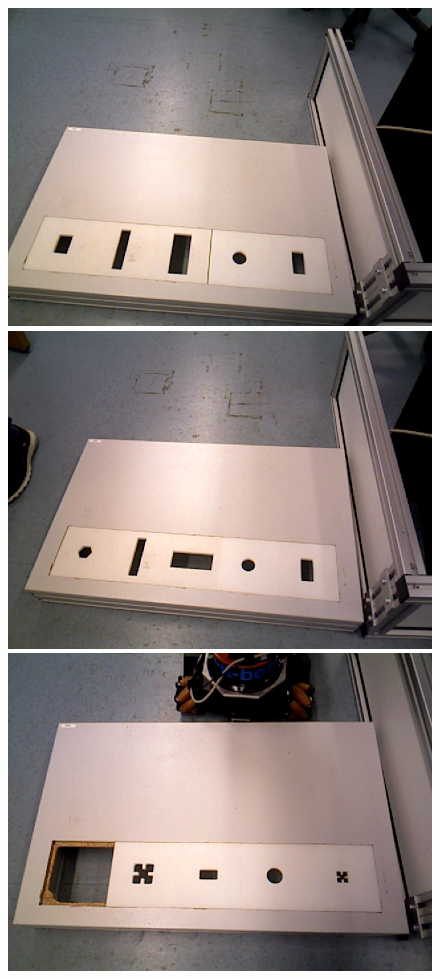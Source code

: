 \documentclass{article}
\begin{document}
\begin{figure}[h!]
\begin{minipage}{\textwidth}
\includegraphics[scale=0.15]{images/Fourth_set.jpg}\vspace{0.1cm}
\includegraphics[scale=0.15]{images/Fifth_set.jpg}\hspace{0.1cm}
\includegraphics[scale=0.15]{images/Sixth_set.jpg}

\end{minipage}
\end{figure}
\end{document}
